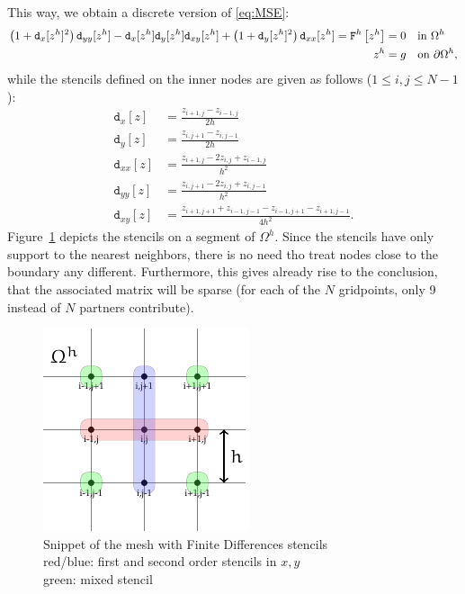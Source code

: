 \documentclass[11pt]{scrartcl}
\newcommand{\mSurfDisc}[1]{\ensuremath{\mathtt{F}^h\left[#1\right]}}
\newcommand{\Dx}[1]{\ensuremath{\mathtt{d}_x[#1]}}
\newcommand{\Dy}[1]{\ensuremath{\mathtt{d}_y[#1]}}
\newcommand{\Dxx}[1]{\ensuremath{\mathtt{d}_{xx}[#1]}}
\newcommand{\Dyy}[1]{\ensuremath{\mathtt{d}_{yy}[#1]}}
\newcommand{\Dxy}[1]{\ensuremath{\mathtt{d}_{xy}[#1]}}
\begin{document}
This way, we obtain a discrete version of \eqref{eq:MSE}:
\begin{align}
	\left(1+\Dx{z^h}^2\right)\Dyy{z^h}-\Dx{z^h} \Dy{z^h}\Dxy{z^h} + \left(1+\Dy{z^h}^2\right)\Dxx{z^h} = \mSurfDisc{z^h} &= 0  \quad \text{in } \Omega^h \notag \\
	z^h &= g \quad \text{on } \partial\Omega^h \label{eq:dMSE},
\end{align}
while the stencils defined on the inner nodes are given as follows ($1 \le i,j \le N-1$):
\begin{align}
	\Dx{z} &= \frac{z_{i+1,j}-z_{i-1,j}}{2h} \\
	\Dy{z} &= \frac{z_{i,j+1}-z_{i,j-1}}{2h} \\
	\Dxx{z} &= \frac{z_{i+1,j} - 2z_{i,j} + z_{i-1,j}}{h^2}\\
	\Dyy{z} &= \frac{z_{i,j+1} - 2z_{i,j} + z_{i,j-1}}{h^2}\\
	\Dxy{z} &= \frac{z_{i+1,j+1} + z_{i-1,j-1} - z_{i-1,j+1}-z_{i+1,j-1}}{4h^2}. 
\end{align}
Figure~\ref{fig:fdmmesh} depicts the stencils on a segment of $\Omega^h$.
Since the stencils have only support to the nearest neighbors, there is no need tho treat nodes close to the boundary any different. Furthermore, this gives already rise to the conclusion, that the associated matrix will be sparse (for each of the $N$ gridpoints, only 9 instead of $N$ partners contribute).

\begin{figure}
	\centering
	\includegraphics[width=.4\linewidth]{figs/FDMMesh}
	\caption{Snippet of the mesh with Finite Differences stencils\\red/blue: first and second order stencils in $x,y$\\
	green: mixed stencil}\label{fig:fdmmesh}
\end{figure}
\newpage
\end{document}
